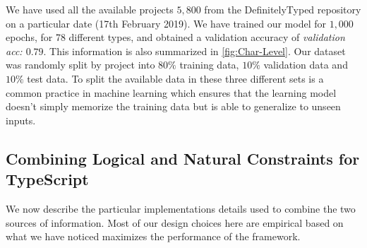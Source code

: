 \documentclass[sigplan,10pt,anonymous]{acmart} %
\theoremstyle{plain}
\theoremstyle{remark}
\theoremstyle{definition}
\begin{document}
We have used all the available projects $5,800$
from the DefinitelyTyped repository on a particular date (17th February 2019).
We have trained our model for $1,000$ epochs, for 78 different types, and obtained a validation accuracy of \emph{validation acc: $0.79$}.
This information is also summarized in \cref{fig:Char-Level}. Our dataset was randomly split by project into $80\%$ training data, $10\%$ validation data and $10\%$ test data. To split the available data in these three different sets is a common practice in machine learning which ensures that the learning model doesn't simply memorize the training data but is able to generalize to unseen inputs.
%     
\subsection{Combining Logical and Natural Constraints for TypeScript}\label{ssec:combprodts}

We now describe the particular implementations details used to combine the two sources of information.
Most of our design choices here are empirical based on what we have noticed maximizes the performance of the framework.
\end{document}
